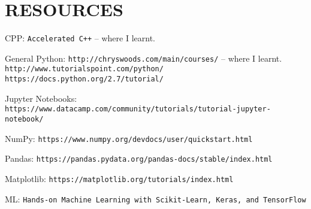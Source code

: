 \section{RESOURCES}

CPP:
\newline
\texttt{Accelerated C++} -- where I learnt.

General Python:
\newline
\texttt{http://chryswoods.com/main/courses/} -- where I learnt.
\newline
\texttt{http://www.tutorialspoint.com/python/}
\newline
\texttt{https://docs.python.org/2.7/tutorial/}

Jupyter Notebooks:
\newline
\texttt{https://www.datacamp.com/community/tutorials/tutorial-jupyter-notebook/}

NumPy:
\newline
\texttt{https://www.numpy.org/devdocs/user/quickstart.html}

Pandas:
\newline
\texttt{https://pandas.pydata.org/pandas-docs/stable/index.html}

Matplotlib:
\newline
\texttt{https://matplotlib.org/tutorials/index.html}

ML:
\newline
\texttt{Hands-on Machine Learning with Scikit-Learn, Keras, and TensorFlow}


\newpage
